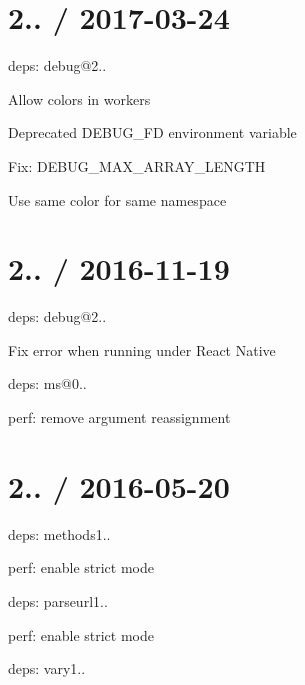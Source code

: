 \section*{2.. / 2017-\/03-\/24 }


\begin{DoxyItemize}
\item deps\+: debug@2..
\begin{DoxyItemize}
\item Allow colors in workers
\item Deprecated {\ttfamily D\+E\+B\+U\+G\+\_\+\+FD} environment variable
\item Fix\+: {\ttfamily D\+E\+B\+U\+G\+\_\+\+M\+A\+X\+\_\+\+A\+R\+R\+A\+Y\+\_\+\+L\+E\+N\+G\+TH}
\item Use same color for same namespace
\end{DoxyItemize}
\end{DoxyItemize}

\section*{2.. / 2016-\/11-\/19 }


\begin{DoxyItemize}
\item deps\+: debug@2..
\begin{DoxyItemize}
\item Fix error when running under React Native
\item deps\+: ms@0..
\end{DoxyItemize}
\item perf\+: remove argument reassignment
\end{DoxyItemize}

\section*{2.. / 2016-\/05-\/20 }


\begin{DoxyItemize}
\item deps\+: methods1..
\begin{DoxyItemize}
\item perf\+: enable strict mode
\end{DoxyItemize}
\item deps\+: parseurl1..
\begin{DoxyItemize}
\item perf\+: enable strict mode
\end{DoxyItemize}
\item deps\+: vary1..
\end{DoxyItemize}

